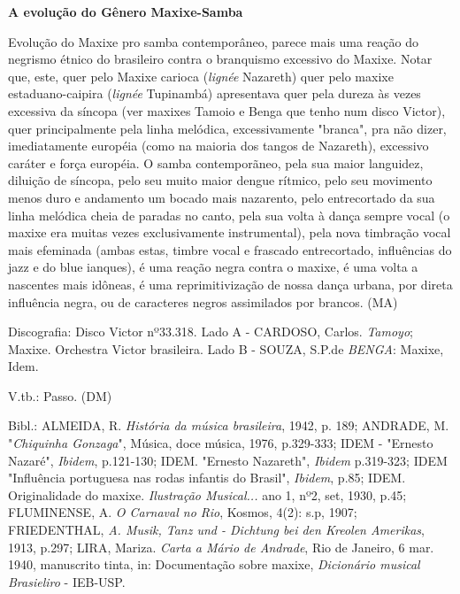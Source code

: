\textbf{A evolução do Gênero Maxixe-Samba}

Evolução do Maxixe pro samba contemporâneo, parece mais uma reação do
negrismo étnico do brasileiro contra o branquismo excessivo do Maxixe.
Notar que, este, quer pelo Maxixe carioca (\emph{lignée} Nazareth) quer
pelo maxixe estaduano-caipira (\emph{lignée} Tupinambá) apresentava quer
pela dureza às vezes excessiva da síncopa (ver maxixes Tamoio e Benga
que tenho num disco Victor), quer principalmente pela linha melódica,
excessivamente "branca", pra não dizer, imediatamente européia (como na
maioria dos tangos de Nazareth), excessivo caráter e força européia. O
samba contemporãneo, pela sua maior languidez, diluição de síncopa, pelo
seu muito maior dengue rítmico, pelo seu movimento menos duro e
andamento um bocado mais nazarento, pelo entrecortado da sua linha
melódica cheia de paradas no canto, pela sua volta à dança sempre vocal
(o maxixe era muitas vezes exclusivamente instrumental), pela nova
timbração vocal mais efeminada (ambas estas, timbre vocal e frascado
entrecortado, influências do jazz e do blue ianques), é uma reação negra
contra o maxixe, é uma volta a nascentes mais idôneas, é uma
reprimitivização de nossa dança urbana, por direta influência negra, ou
de caracteres negros assimilados por brancos. (MA)

Discografia: Disco Victor nº33.318. Lado A - CARDOSO, Carlos.
\emph{Tamoyo}; Maxixe. Orchestra Victor brasileira. Lado B - SOUZA,
S.P.de \emph{BENGA}: Maxixe, Idem.

V.tb.: Passo. (DM)

Bibl.: ALMEIDA, R. \emph{História da música brasileira}, 1942, p. 189;
ANDRADE, M. "\emph{Chiquinha Gonzaga}", Música, doce música, 1976,
p.329-333; IDEM - "Ernesto Nazaré", \emph{Ibidem}, p.121-130; IDEM.
"Ernesto Nazareth", \emph{Ibidem} p.319-323; IDEM "Influência portuguesa
nas rodas infantis do Brasil", \emph{Ibidem}, p.85; IDEM. Originalidade
do maxixe. \emph{Ilustração Musical...} ano 1, nº2, set, 1930, p.45;
FLUMINENSE, A. \emph{O Carnaval no Rio}, Kosmos, 4(2): s.p, 1907;
FRIEDENTHAL, \emph{A. Musik, Tanz und - Dichtung bei den Kreolen
Amerikas}, 1913, p.297; LIRA, Mariza. \emph{Carta a Mário de Andrade},
Rio de Janeiro, 6 mar. 1940, manuscrito tinta, in: Documentação sobre
maxixe, \emph{Dicionário musical Brasieliro} - IEB-USP.

